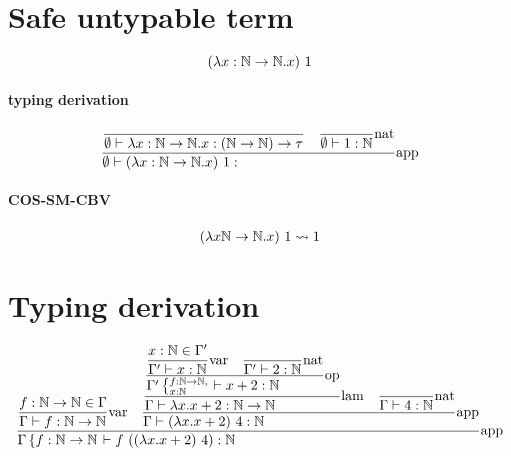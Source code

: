 \documentclass{article}
\newcommand{\st}[3][]{\ensuremath{\displaystyle\frac{#3\hfill}{#2\hfill} \text{#1}}}
\newcommand{\N}{\ensuremath \mathbb N}
\newcommand{\lam}[2]{\ensuremath{\lambda#1.#2}}
\begin{document}

\section{Safe untypable term}
\begin{equation*}
    (\lam{x:\N\to\N}{x})\ 1
\end{equation*}

\paragraph{typing derivation}
\begin{align*}
    \st[app]{
        \emptyset\vdash (\lam{x:\N\to\N}{x})\ 1: 
    }{
        \st[]{
            \emptyset\vdash\lam{x:\N\to\N}{x}:(\N\to\N)\to\tau
        }{}
        \quad
        \st[nat]{
            \emptyset\vdash 1:\N
        }{}
    }
\end{align*}

\paragraph{COS-SM-CBV}
\begin{align*}
    (\lam{x\N\to\N}{x})\ 1 \leadsto 1
\end{align*}

\section{Typing derivation}
\begin{equation*}
    \st[app]{
        \Gamma\left\{f:\N\to\N\right. \vdash f\ ((\lam{x}{x+2})\ 4): \N
    }{
        \st[var]{
            \Gamma \vdash f:\N\to\N
        }{
            f:\N\to\N \in \Gamma
        }
        \quad
        \st[app]{
            \Gamma\vdash (\lam{x}{x+2})\ 4: \N
        }{
            \st[lam]{
                \Gamma\vdash \lam{x}{x+2}:\N\to\N
            }{
                \st[op]{
                    \Gamma'\left\{\substack{f:\N\to\N\hfill,\\x:\N\hfill}\right.\vdash x+2:\N
                }{
                    \st[var]{
                        \Gamma'\vdash x:\N
                    }{
                        x:\N\in\Gamma'
                    }
                    \quad
                    \st[nat]{
                        \Gamma'\vdash 2:\N
                    }{
                    }
                }
            }
            \quad
            \st[nat]{
                \Gamma\vdash 4:\N
            }{}
        }
    }
\end{equation*}
\end{document}
